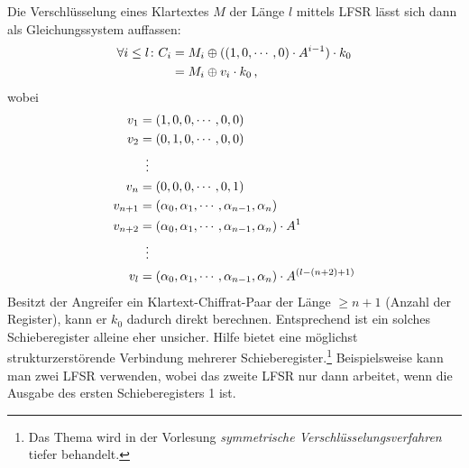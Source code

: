 Die Verschlüsselung eines Klartextes $M$ der Länge $l$ mittels LFSR lässt sich dann als Gleichungssystem auffassen:
\begin{equation*}
	\begin{split}
			\forall i \leq l \colon C_i 	&= M_i \oplus ((1,0,\cdots,0) \cdot A^{i-1}) \cdot k_0\\
									&= M_i \oplus v_i \cdot k_0 \, \text{,}
	\end{split}
\end{equation*}
wobei
\begin{align*}
	v_1 &= (1, 0, 0, \cdots, 0, 0)\\
	v_2 &= (0, 1, 0, \cdots, 0, 0)\\
	       &\mathrel{\makebox[\widthof{=}]{\vdots}}\\
	v_n &= (0, 0, 0, \cdots, 0, 1)\\
	v_{n+1} &= (\alpha_0, \alpha_1, \cdots, \alpha_{n-1}, \alpha_n)\\
	v_{n+2} &= (\alpha_0, \alpha_1, \cdots, \alpha_{n-1}, \alpha_n) \cdot A^1\\
	             &\mathrel{\makebox[\widthof{=}]{\vdots}}\\
	v_l &= (\alpha_0, \alpha_1, \cdots, \alpha_{n-1}, \alpha_n) \cdot A^{(l - (n+2) + 1)}
\end{align*}
Besitzt der Angreifer ein Klartext-Chiffrat-Paar der Länge $\geq n+1$ (Anzahl der Register), kann er $k_0$ dadurch direkt berechnen. Entsprechend ist ein solches Schieberegister alleine eher unsicher. Hilfe bietet eine möglichst strukturzerstörende Verbindung mehrerer Schieberegister.\footnote{Das Thema wird in der Vorlesung \emph{symmetrische Verschlüsselungsverfahren} tiefer behandelt.} Beispielsweise kann man zwei LFSR verwenden, wobei das zweite LFSR nur dann arbeitet, wenn die Ausgabe des ersten Schieberegisters 1 ist.

